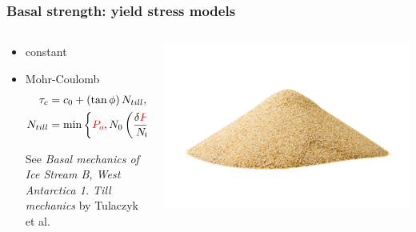\documentclass[hide notes,intlimits]{beamer}
\begin{document}
\begin{frame}
  \frametitle{Basal strength: yield stress models}

  \begin{columns}
    \begin{column}{0.6\linewidth}
      \begin{itemize}
      \item constant
      \item Mohr-Coulomb
        \begin{align*}
          \tau_c &= c_{0} + (\tan\phi)\,N_{till},\\
          N_{till} &= \min\left\{{\color{red} P_o}, N_0 \left(\frac{\delta {\color{red} P_o}}{N_0}\right)^{{\color{red} s}} 10^{(e_0/C_c) (1 - {\color{red} s})}\right\}.
        \end{align*}

        See \emph{Basal mechanics of Ice Stream B, West Antarctica 1.
          Till mechanics} by Tulaczyk et al.
      \end{itemize}
    \end{column}

    \begin{column}{0.4\linewidth}
      \includegraphics[width=\linewidth]{sand-pile}
    \end{column}
  \end{columns}

\end{frame}
\end{document}
